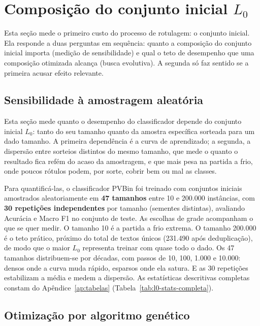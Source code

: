 \section{Composição do conjunto inicial \texorpdfstring{$L_0$}{L0}}
\label{sec:metodo-l0}

Esta seção mede o primeiro custo do processo de rotulagem: o conjunto
inicial. Ela responde a duas perguntas em sequência: quanto a composição
do conjunto inicial importa (medição de sensibilidade) e qual o teto de
desempenho que uma composição otimizada alcança (busca evolutiva). A segunda
só faz sentido se a primeira acusar efeito relevante.

\subsection{Sensibilidade à amostragem aleatória}
\label{sec:metodo-l0-sensibilidade}

Esta seção mede quanto o desempenho do classificador depende do conjunto
inicial $L_0$: tanto do seu tamanho quanto da amostra específica sorteada para
um dado tamanho. A primeira dependência é a curva de aprendizado; a segunda, a
dispersão entre sorteios distintos do mesmo tamanho, que mede o quanto o
resultado fica refém do acaso da amostragem, e que mais pesa na partida a frio,
onde poucos rótulos podem, por sorte, cobrir bem ou mal as classes.

Para quantificá-las, o classificador PVBin foi treinado com conjuntos iniciais
amostrados aleatoriamente em \textbf{47 tamanhos} entre 10 e 200.000 instâncias,
com \textbf{30 repetições independentes} por tamanho (sementes distintas),
avaliando Acurácia e Macro F1 no conjunto de teste. As escolhas de grade
acompanham o que se quer medir. O tamanho 10 é a partida a frio extrema. O
tamanho 200.000 é o teto prático, próximo do total de textos únicos (231.490
após deduplicação), de modo que o maior $L_0$ representa treinar com quase todo
o dado. Os 47 tamanhos distribuem-se por décadas, com passos de 10, 100, 1.000 e
10.000: densos onde a curva muda rápido, esparsos onde ela satura. E as 30
repetições estabilizam a média e medem a dispersão. As estatísticas descritivas completas constam do
Apêndice~\ref{ap:tabelas} (Tabela~\ref{tab:l0-stats-completa}).

\subsection{Otimização por algoritmo genético}
\label{sec:metodo-l0-ag}

